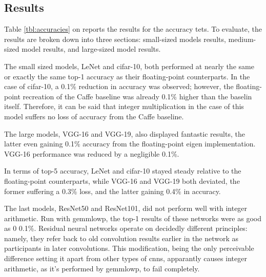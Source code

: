 \subsection{Results}
Table \ref{tbl:accuracies} on \pageref{tbl:accuracies} reports the results for the accuracy tets. To evaluate, the results are broken down into three sections: small-sized models results, medium-sized model results, and large-sized model results.

The small sized models, LeNet and cifar-10, both performed at nearly the same or exactly the same top-1 accuracy as their floating-point counterparts. In the case of cifar-10, a 0.1\% reduction in accuracy was observed; however, the floating-point recreation of the Caffe baseline was already 0.1\% higher than the baselin itself. Therefore, it can be said that integer multiplication in the case of this model suffers no loss of accuracy from the Caffe baseline.

The large models, VGG-16 and VGG-19, also displayed fantastic results, the latter even gaining 0.1\% accuracy from the floating-point eigen implementation. VGG-16 performance was reduced by a negligible 0.1\%.

In terms of top-5 accuracy, LeNet and cifar-10 stayed steady relative to the floating-point counterparts, while VGG-16 and VGG-19 both deviated, the former suffering a 0.3\% loss, and the latter gaining 0.4\% in accuracy.

The last models, ResNet50 and ResNet101, did not perform well with integer arithmetic. Run with gemmlowp, the top-1 results of these networks were as good as 0\/ 0.1\%. Residual neural networks operate on decidedly different principles: namely, they refer back to old convolution results earlier in the network as participants in later convolutions. This modification, being the only perceivable difference setting it apart from other types of cnns, apparantly causes integer arithmetic, as it's performed by gemmlowp, to fail completely.

